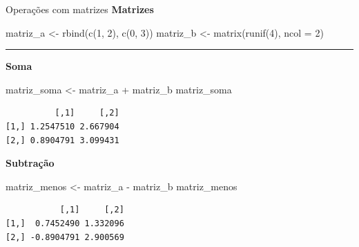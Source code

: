 \documentclass[
  10pt,
  ignorenonframetext,
]{beamer}
\newenvironment{Shaded}{\begin{snugshade}}{\end{snugshade}}
\newcommand{\AttributeTok}[1]{\textcolor[rgb]{0.40,0.45,0.13}{#1}}
\newcommand{\DecValTok}[1]{\textcolor[rgb]{0.68,0.00,0.00}{#1}}
\newcommand{\FunctionTok}[1]{\textcolor[rgb]{0.28,0.35,0.67}{#1}}
\newcommand{\NormalTok}[1]{\textcolor[rgb]{0.00,0.23,0.31}{#1}}
\newcommand{\OtherTok}[1]{\textcolor[rgb]{0.00,0.23,0.31}{#1}}
\newcommand{\SpecialCharTok}[1]{\textcolor[rgb]{0.37,0.37,0.37}{#1}}
\newcommand*{\regrafina}{\rule{\textwidth}{0.5pt}}
\begin{document}
\begin{frame}[fragile]{Operações com matrizes}
\protect\hypertarget{operauxe7uxf5es-com-matrizes}{}
\textbf{Matrizes}

\begin{Shaded}
\begin{Highlighting}[]
\NormalTok{matriz\_a }\OtherTok{\textless{}{-}} \FunctionTok{rbind}\NormalTok{(}\FunctionTok{c}\NormalTok{(}\DecValTok{1}\NormalTok{, }\DecValTok{2}\NormalTok{), }\FunctionTok{c}\NormalTok{(}\DecValTok{0}\NormalTok{, }\DecValTok{3}\NormalTok{))}
\NormalTok{matriz\_b }\OtherTok{\textless{}{-}} \FunctionTok{matrix}\NormalTok{(}\FunctionTok{runif}\NormalTok{(}\DecValTok{4}\NormalTok{), }\AttributeTok{ncol =} \DecValTok{2}\NormalTok{)}
\end{Highlighting}
\end{Shaded}

\regrafina

\small

\textbf{Soma}

\begin{Shaded}
\begin{Highlighting}[]
\NormalTok{matriz\_soma }\OtherTok{\textless{}{-}}\NormalTok{ matriz\_a }\SpecialCharTok{+}\NormalTok{ matriz\_b}
\NormalTok{matriz\_soma}
\end{Highlighting}
\end{Shaded}

\begin{verbatim}
          [,1]     [,2]
[1,] 1.2547510 2.667904
[2,] 0.8904791 3.099431
\end{verbatim}

\textbf{Subtração}

\begin{Shaded}
\begin{Highlighting}[]
\NormalTok{matriz\_menos }\OtherTok{\textless{}{-}}\NormalTok{ matriz\_a }\SpecialCharTok{{-}}\NormalTok{ matriz\_b}
\NormalTok{matriz\_menos}
\end{Highlighting}
\end{Shaded}

\begin{verbatim}
           [,1]     [,2]
[1,]  0.7452490 1.332096
[2,] -0.8904791 2.900569
\end{verbatim}

\normalsize
\end{frame}
\end{document}
